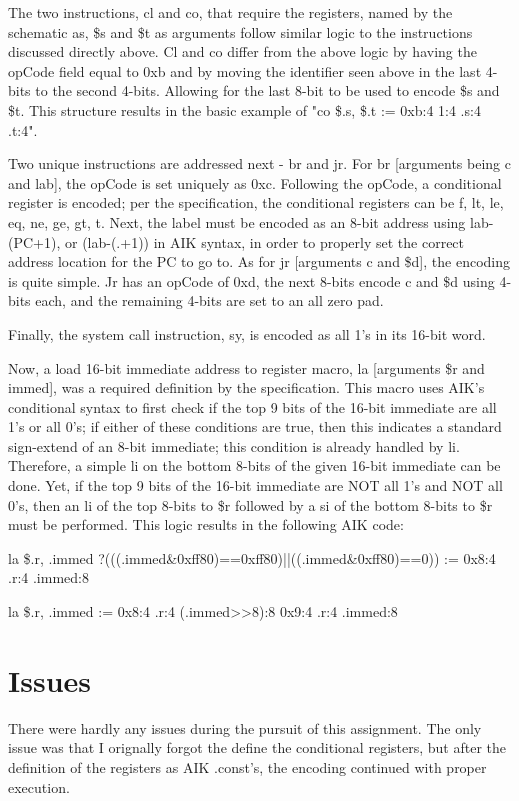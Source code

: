 \documentclass[sigconf]{acmart}
\begin{document}
The two instructions, cl and co, that require the registers, named by the schematic as, \$s and \$t as arguments follow similar logic to the instructions discussed directly above. Cl and co differ from the above logic by having the opCode field equal to 0xb and by moving the identifier seen above in the last 4-bits to the second 4-bits. Allowing for the last 8-bit to be used to encode \$s and \$t. This structure results in the basic example of "co	\$.s, \$.t	:=	0xb:4	1:4	.s:4	.t:4".

Two unique instructions are addressed next - br and jr. For br [arguments being c and lab], the opCode is set uniquely as 0xc. Following the opCode, a conditional register is encoded; per the specification, the conditional registers can be f, lt, le, eq, ne, ge, gt, t. Next, the label must be encoded as an 8-bit address using lab-(PC+1), or (lab-(.+1)) in AIK syntax, in order to properly set the correct address location for the PC to go to. As for jr [arguments c and \$d], the encoding is quite simple. Jr has an opCode of 0xd, the next 8-bits encode c and \$d using 4-bits each, and the remaining 4-bits are set to an all zero pad.

Finally, the system call instruction, sy, is encoded as all 1's in its 16-bit word.

Now, a load 16-bit immediate address to register macro, la [arguments \$r and immed], was a required definition by the specification. This macro uses AIK's conditional syntax to first check if the top 9 bits of the 16-bit immediate are all 1's or all 0's; if either of these conditions are true, then this indicates a standard sign-extend of an 8-bit immediate; this condition is already handled by li. Therefore, a simple li on the bottom 8-bits of the given 16-bit immediate can be done. Yet, if the top 9 bits of the 16-bit immediate are NOT all 1's and NOT all 0's, then an li of the top 8-bits to \$r followed by a si of the bottom 8-bits to \$r must be performed. This logic results in the following AIK code:

la \$.r, .immed ?(((.immed&0xff80)==0xff80)||((.immed&0xff80)==0)) := { 
   0x8:4 .r:4 .immed:8 }

la \$.r, .immed := { 
   0x8:4 .r:4 (.immed>>8):8 
   0x9:4 .r:4 .immed:8 }

\vfill\pagebreak

\section{Issues}

There were hardly any issues during the pursuit of this assignment. The only issue was that I orignally forgot the define the conditional registers, but after the definition of the registers as AIK .const's, the encoding continued with proper execution.
\end{document}
